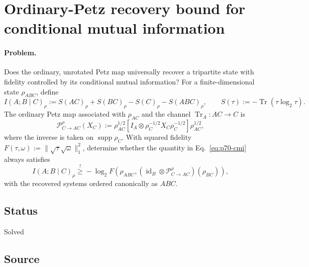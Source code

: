 \section{Ordinary-Petz recovery bound for conditional mutual information}
\label{sec:op_87c77263c8bab523}

\paragraph{Problem.}
Does the ordinary, unrotated Petz map universally recover a tripartite state
with fidelity controlled by its conditional mutual information?  For a
finite-dimensional state $\rho_{ABC}$, define
\begin{equation}
  I(A;B\mid C)_\rho
  :=S(AC)_\rho+S(BC)_\rho-S(C)_\rho-S(ABC)_\rho,
  \qquad
  S(\tau):=-\operatorname{Tr}(\tau\log_2\tau).
  \label{eq:p70-cmi}
\end{equation}
The ordinary Petz map associated with $\rho_{AC}$ and the channel
$\operatorname{Tr}_A:AC\to C$ is
\begin{equation}
  \mathcal P^{\rho}_{C\to AC}(X_C)
  :=\rho_{AC}^{1/2}\!\left[
      I_A\otimes\rho_C^{-1/2}X_C\rho_C^{-1/2}
    \right]\rho_{AC}^{1/2},
  \label{eq:p70-petz-map}
\end{equation}
where the inverse is taken on $\operatorname{supp}\rho_C$.  With squared
fidelity $F(\tau,\omega):=\lVert\sqrt\tau\sqrt\omega\rVert_1^2$, determine
whether the quantity in Eq.~\eqref{eq:p70-cmi} always satisfies
\begin{equation}
  I(A;B\mid C)_\rho
  \stackrel{?}{\geq}
  -\log_2 F\!\left(
    \rho_{ABC},
    (\operatorname{id}_B\otimes\mathcal P^{\rho}_{C\to AC})(\rho_{BC})
  \right),
  \label{eq:p70-ordinary-petz-cmi}
\end{equation}
with the recovered systems ordered canonically as $ABC$.

\subsection*{Status}

Solved

\subsection*{Source}

